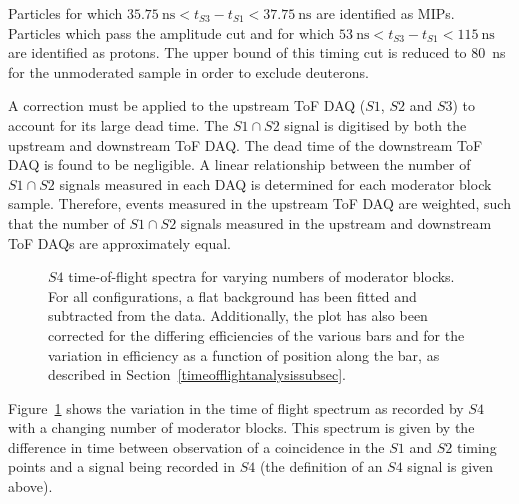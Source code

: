 Particles for which $35.75~\text{ns}<t_{\mathit{S3}}-t_{\mathit{S1}}<37.75~\text{ns}$ are identified as MIPs.
Particles which pass the amplitude cut and for which $53~\text{ns}<t_{\mathit{S3}}-t_{\mathit{S1}}<115~\text{ns}$ are identified as protons.
The upper bound of this timing cut is reduced to 80~ns for the unmoderated sample in order to exclude deuterons.

A correction must be applied to the upstream ToF DAQ ($\mathit{S1}$, $\mathit{S2}$ and $\mathit{S3}$) to account for its large dead time.
The $\mathit{S1} \cap \mathit{S2}$ signal is digitised by both the upstream and downstream ToF DAQ.
The dead time of the downstream ToF DAQ is found to be negligible.
A linear relationship between the number of $\mathit{S1} \cap \mathit{S2}$ signals measured in each DAQ is determined for each moderator block sample.
Therefore, events measured in the upstream ToF DAQ are weighted, such that the number of $\mathit{S1} \cap \mathit{S2}$ signals measured in the upstream and downstream ToF DAQs are approximately equal.

\begin{figure}[h]
  \begin{adjustbox}{max totalsize={.9\textwidth}{.5\textheight},center}
    
  \end{adjustbox}
  \caption{$\mathit{S4}$ time-of-flight spectra for varying numbers of moderator blocks. For all configurations, a flat background has been fitted and subtracted from the data. Additionally, the plot has also been corrected for the differing efficiencies of the various bars and for the variation in efficiency as a function of position along the bar, as described in Section~\ref{timeofflightanalysissubsec}.}
  \label{fig:s4tof}	
\end{figure}

Figure~\ref{fig:s4tof} shows the variation in the time of flight spectrum as recorded by $\mathit{S4}$ with a changing number of moderator blocks.
This spectrum is given by the difference in time between observation of a coincidence in the $\mathit{S1}$ and $\mathit{S2}$ timing points and a signal being recorded in $\mathit{S4}$ (the definition of an $\mathit{S4}$ signal is given above).

